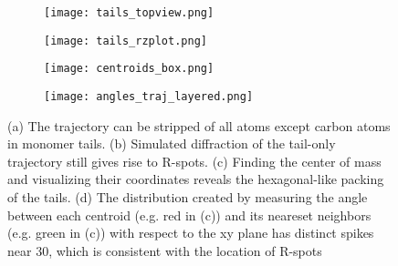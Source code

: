 \begin{figure}[ht]
	\centering
	\begin{subfigure}{0.45\textwidth}
		\centering
		\hspace{-1cm}
		\vspace{1cm}
		\texttt{[image: tails\_topview.png]}
		\caption{}\label{fig:tails_topview}
	\end{subfigure}
	\begin{subfigure}{0.45\textwidth}
		\centering
		\texttt{[image: tails\_rzplot.png]}
		\caption{}\label{fig:tails_rzplot}
	\end{subfigure}
	\begin{subfigure}{0.45\textwidth}
		\centering
		\texttt{[image: centroids\_box.png]}
		\caption{}\label{fig:centroids}
	\end{subfigure}
	\begin{subfigure}{0.45\textwidth}
		\centering
		\texttt{[image: angles\_traj\_layered.png]}
		\caption{}\label{fig:angle_distribution}
	\end{subfigure}
	\caption{(a) The trajectory can be stripped of all atoms except carbon
	atoms in monomer tails. (b) Simulated diffraction of the tail-only trajectory
	still gives rise to R-spots. (c) Finding the center of mass and visualizing 
	their coordinates reveals the hexagonal-like packing of the tails. (d) The 
	distribution created by measuring the angle between each centroid (e.g. red 
	in (c)) and its neareset neighbors (e.g. green in (c)) with respect to the xy
	plane has distinct spikes near 30\degree, which is consistent with the location
	of R-spots}\label{fig:tail_packing}
\end{figure}

